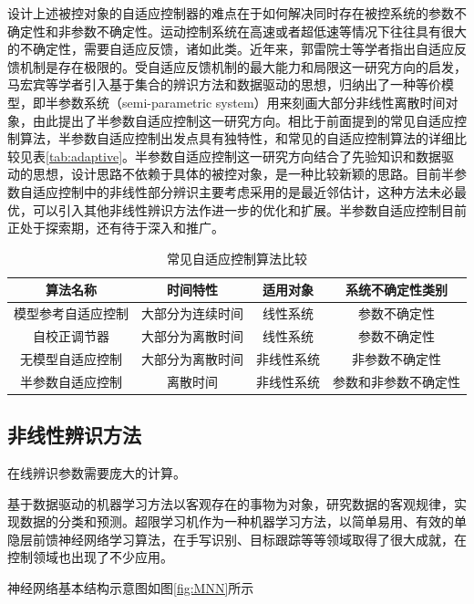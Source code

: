 设计上述被控对象的自适应控制器的难点在于如何解决同时存在被控系统的参数不确定性和非参数不确定性。运动控制系统在高速或者超低速等情况下往往具有很大的不确定性，需要自适应反馈，诸如此类。近年来，郭雷院士等学者指出自适应反馈机制是存在极限的。受自适应反馈机制的最大能力和局限这一研究方向的启发，马宏宾等学者引入基于集合的辨识方法和数据驱动的思想，归纳出了一种等价模型，即半参数系统（semi-parametric system）用来刻画大部分非线性离散时间对象，由此提出了半参数自适应控制这一研究方向。相比于前面提到的常见自适应控制算法，半参数自适应控制出发点具有独特性，和常见的自适应控制算法的详细比较见表\eqref{tab:adaptive}。半参数自适应控制这一研究方向结合了先验知识和数据驱动的思想，设计思路不依赖于具体的被控对象，是一种比较新颖的思路。目前半参数自适应控制中的非线性部分辨识主要考虑采用的是最近邻估计，这种方法未必最优，可以引入其他非线性辨识方法作进一步的优化和扩展。半参数自适应控制目前正处于探索期，还有待于深入和推广。
\begin{table}\centering
\caption{常见自适应控制算法比较}\label{tab:adaptive}
\begin{tabular}{|c|c|c|c|}\hline
算法名称 & 时间特性 & 适用对象 & 系统不确定性类别 \\ \hline
模型参考自适应控制 &  大部分为连续时间 & 线性系统 & 参数不确定性\\ \hline
自校正调节器 &  大部分为离散时间 & 线性系统 & 参数不确定性\\ \hline
无模型自适应控制 & 大部分为离散时间  & 非线性系统 & 非参数不确定性\\ \hline
半参数自适应控制 & 离散时间  & 非线性系统 & 参数和非参数不确定性\\ \hline
\end{tabular}
\end{table}

\subsection{非线性辨识方法}
\label{subsec:ElmApp}

在线辨识参数需要庞大的计算。

基于数据驱动的机器学习方法以客观存在的事物为对象，研究数据的客观规律，实现数据的分类和预测。超限学习机作为一种机器学习方法，以简单易用、有效的单隐层前馈神经网络学习算法，在手写识别、目标跟踪等等领域取得了很大成就，在控制领域也出现了不少应用。

神经网络基本结构示意图如图\ref{fig:MNN}所示

